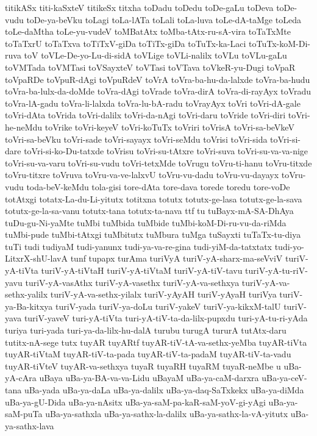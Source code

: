 {titikASx
titi-kaSxteV
titikeSx
titxha
toDadu
toDedu
toDe-gaLu
toDeva
toDe-vudu
toDe-ya-beVku
toLagi
toLa-lATa
toLali
toLa-luva
toLe-dA-taMge
toLeda
toLe-daMtha
toLe-yu-vudeV
toMBatAtx
toMba-tAtx-ru-sA-vira
toTaTxMte
toTaTxrU
toTaTxva
toTiTxV-giDa
toTiTx-giDa
toTuTx-ka-Laci
toTuTx-koM-Di-ruva
toV
toVLe-De-yo-Lu-di-sidA
toVLige
toVLi-nalilx
toVLu
toVLu-gaLu
toVMTada
toVMTasi
toVSayxteV
toVTasi
toVTava
toVkeR-yu-Dugi
toVpaR
toVpaRDe
toVpuR-dAgi
toVpuRdeV
toVrA
toVra-ba-hu-da-lalxde
toVra-ba-hudu
toVra-ba-lulx-da-doMde
toVra-dAgi
toVrade
toVra-dirA
toVra-di-rayAyx
toVradu
toVra-lA-gadu
toVra-li-lalxda
toVra-lu-bA-radu
toVrayAyx
toVri
toVri-dA-gale
toVri-dAta
toVrida
toVri-dalilx
toVri-da-nAgi
toVri-daru
toVride
toVri-diri
toVri-he-neMdu
toVrike
toVri-keyeV
toVri-koTuTx
toVriri
toVrisA
toVri-sa-beVkeV
toVri-sa-beVku
toVri-sade
toVri-sayayx
toVri-seMdu
toVrisi
toVri-sida
toVri-si-dare
toVri-si-ko-Du-tatxde
toVrisu
toVri-su-tAtxre
toVri-suva
toVri-su-va-va-nige
toVri-su-va-varu
toVri-su-vudu
toVri-tetxMde
toVrugu
toVru-ti-hanu
toVru-titxde
toVru-titxre
toVruva
toVru-va-ve-lalxvU
toVru-vu-dadu
toVru-vu-dayayx
toVru-vudu
toda-beV-keMdu
tola-gisi
tore-dAta
tore-dava
torede
toredu
tore-voDe
totAtxgi
totatx-La-du-Li-yitutx
totitxna
totutx
totutx-ge-lasa
totutx-ge-la-sava
totutx-ge-la-sa-vanu
totutx-tana
totutx-ta-nava
ttf
tu
tuBayx-mA-SA-DhAya
tuDu-gu-Ni-yaMte
tuMbi
tuMbida
tuMbide
tuMbi-koM-Di-ru-vu-da-riMda
tuMbi-pude
tuMbi-tAtxgi
tuMbitutx
tuMbura
tuMga
tuSayxti
tuTaTx-tu-diya
tuTi
tudi
tudiyaM
tudi-yanunx
tudi-ya-va-re-gina
tudi-yiM-da-tatxtatx
tudi-yo-LitxrX-shU-lavA
tunf
tupapx
turAma
turiVyA
turiV-yA-sharx-ma-seVviV
turiV-yA-tiVta
turiV-yA-tiVtaH
turiV-yA-tiVtaM
turiV-yA-tiV-tavu
turiV-yA-tu-riV-yavu
turiV-yA-vasAthx
turiV-yA-vasethx
turiV-yA-va-sethxya
turiV-yA-va-sethx-yalilx
turiV-yA-va-sethx-yilalx
turiV-yAyAH
turiV-yAyaH
turiVya
turiV-ya-Ba-kitxya
turiV-yada
turiV-ya-doLu
turiV-yakeV
turiV-ya-kikxM-talU
turiV-yava
turiV-yaveV
turi-yA-tiVta
turi-yA-tiV-ta-da-lilx-pupxdu
turi-yA-tu-ri-yAda
turiya
turi-yada
turi-ya-da-lilx-hu-dalA
turubu
turugA
tururA
tutAtx-daru
tutitx-nA-sege
tutx
tuyAR
tuyARtf
tuyAR-tiV-tA-va-sethx-yeMba
tuyAR-tiVta
tuyAR-tiVtaM
tuyAR-tiV-ta-pada
tuyAR-tiV-ta-padaM
tuyAR-tiV-ta-vadu
tuyAR-tiVteV
tuyAR-va-sethxya
tuyaR
tuyaRH
tuyaRM
tuyaR-neMbe
u
uBa-yA-cAra
uBaya
uBa-ya-BA-va-va-Lidu
uBayaM
uBa-ya-caM-darxra
uBa-ya-ceV-tana
uBa-yada
uBa-ya-daLa
uBa-ya-dalilx
uBa-ya-daq-SaTxkekx
uBa-ya-diMda
uBa-ya-gU-Dida
uBa-ya-nAsitx
uBa-ya-saM-pa-kaR-saM-yoV-gi-yAgi
uBa-ya-saM-puTa
uBa-ya-sathxla
uBa-ya-sathx-la-dalilx
uBa-ya-sathx-la-vA-yitutx
uBa-ya-sathx-lava
}
